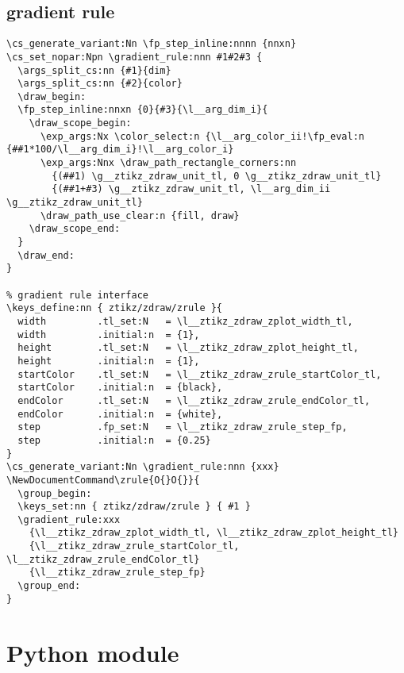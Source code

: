 \subsection{gradient rule}
\begin{verbatim}
\cs_generate_variant:Nn \fp_step_inline:nnnn {nnxn}
\cs_set_nopar:Npn \gradient_rule:nnn #1#2#3 {
  \args_split_cs:nn {#1}{dim}
  \args_split_cs:nn {#2}{color}
  \draw_begin:
  \fp_step_inline:nnxn {0}{#3}{\l__arg_dim_i}{
    \draw_scope_begin:
      \exp_args:Nx \color_select:n {\l__arg_color_ii!\fp_eval:n {##1*100/\l__arg_dim_i}!\l__arg_color_i} 
      \exp_args:Nnx \draw_path_rectangle_corners:nn 
        {(##1) \g__ztikz_zdraw_unit_tl, 0 \g__ztikz_zdraw_unit_tl}
        {(##1+#3) \g__ztikz_zdraw_unit_tl, \l__arg_dim_ii \g__ztikz_zdraw_unit_tl}
      \draw_path_use_clear:n {fill, draw}
    \draw_scope_end:
  }
  \draw_end:
}

% gradient rule interface
\keys_define:nn { ztikz/zdraw/zrule }{
  width         .tl_set:N   = \l__ztikz_zdraw_zplot_width_tl,
  width         .initial:n  = {1},
  height        .tl_set:N   = \l__ztikz_zdraw_zplot_height_tl,
  height        .initial:n  = {1},
  startColor    .tl_set:N   = \l__ztikz_zdraw_zrule_startColor_tl,
  startColor    .initial:n  = {black},
  endColor      .tl_set:N   = \l__ztikz_zdraw_zrule_endColor_tl,
  endColor      .initial:n  = {white},
  step          .fp_set:N   = \l__ztikz_zdraw_zrule_step_fp,
  step          .initial:n  = {0.25}
}
\cs_generate_variant:Nn \gradient_rule:nnn {xxx}
\NewDocumentCommand\zrule{O{}O{}}{
  \group_begin:
  \keys_set:nn { ztikz/zdraw/zrule } { #1 }
  \gradient_rule:xxx 
    {\l__ztikz_zdraw_zplot_width_tl, \l__ztikz_zdraw_zplot_height_tl}
    {\l__ztikz_zdraw_zrule_startColor_tl, \l__ztikz_zdraw_zrule_endColor_tl}
    {\l__ztikz_zdraw_zrule_step_fp}
  \group_end:
}
\end{verbatim}


\section{Python module}
